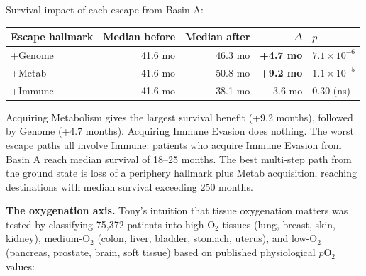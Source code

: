 \documentclass[
  11pt,
]{article}
\newcounter{none} %
\begin{document}
Survival impact of each escape from Basin A:

{\def\LTcaptype{none} %
\begin{longtable}[]{@{}lrrrl@{}}
\toprule\noalign{}
Escape hallmark & Median before & Median after & \(\Delta\) & \(p\) \\
\midrule\noalign{}
\endhead
\bottomrule\noalign{}
\endlastfoot
+Genome & 41.6 mo & 46.3 mo & \textbf{+4.7 mo} &
\(7.1 \times 10^{-6}\) \\
+Metab & 41.6 mo & 50.8 mo & \textbf{+9.2 mo} &
\(1.1 \times 10^{-5}\) \\
+Immune & 41.6 mo & 38.1 mo & \(-3.6\) mo & 0.30 (ns) \\
\end{longtable}
}

Acquiring Metabolism gives the largest survival benefit (+9.2 months),
followed by Genome (+4.7 months). Acquiring Immune Evasion does nothing.
The worst escape paths all involve Immune: patients who acquire Immune
Evasion from Basin A reach median survival of 18--25 months. The best
multi-step path from the ground state is loss of a periphery hallmark
plus Metab acquisition, reaching destinations with median survival
exceeding 250 months.

\textbf{The oxygenation axis.} Tony's intuition that tissue oxygenation
matters was tested by classifying 75,372 patients into
high-\(\mathrm{O}_2\) tissues (lung, breast, skin, kidney),
medium-\(\mathrm{O}_2\) (colon, liver, bladder, stomach, uterus), and
low-\(\mathrm{O}_2\) (pancreas, prostate, brain, soft tissue) based on
published physiological \(p\mathrm{O}_2\) values:
\end{document}

